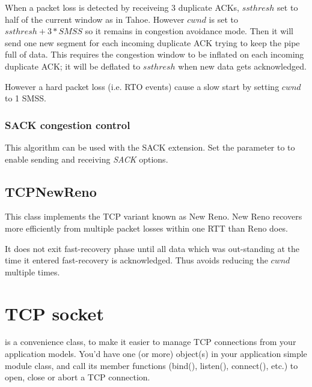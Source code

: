 When a packet loss is detected by receiveing 3 duplicate ACKs,
$ssthresh$ set to half of the current window as in Tahoe. However
$cwnd$ is set to $ssthresh + 3*SMSS$ so it remains in congestion
avoidance mode. Then it will send one new segment for each incoming
duplicate ACK trying to keep the pipe full of data. This requires
the congestion window to be inflated on each incoming duplicate
ACK; it will be deflated to $ssthresh$ when new data gets
acknowledged.

However a hard packet loss (i.e. RTO events) cause a
slow start by setting $cwnd$ to 1 SMSS.

\subsubsection*{SACK congestion control}

This algorithm can be used with the SACK extension.
Set the  parameter to  to
enable sending and receiving \emph{SACK} options.

\subsection{TCPNewReno}

This class implements the TCP variant known as New Reno.
New Reno recovers more efficiently from multiple packet losses within one RTT
than Reno does.

It does not exit fast-recovery phase until all data which was out-standing
at the time it entered fast-recovery is acknowledged. Thus avoids
reducing the $cwnd$ multiple times.

\section{TCP socket}


 is a convenience class, to make it easier to manage TCP connections
from your application models. You'd have one (or more)  object(s)
in your application simple module class, and call its member functions
(bind(), listen(), connect(), etc.) to open, close or abort a TCP connection.


